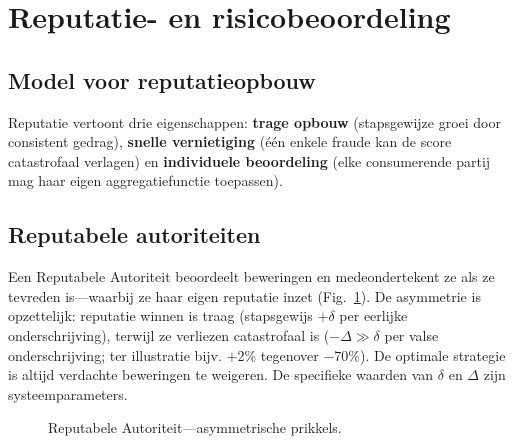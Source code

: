 \documentclass[11pt,a4paper,twocolumn]{article}
\begin{document}
\section{Reputatie- en risicobeoordeling}

\subsection{Model voor reputatieopbouw}

Reputatie vertoont drie eigenschappen: \textbf{trage opbouw} (stapsgewijze groei door consistent gedrag), \textbf{snelle vernietiging} (één enkele fraude kan de score catastrofaal verlagen) en \textbf{individuele beoordeling} (elke consumerende partij mag haar eigen aggregatiefunctie toepassen).

\subsection{Reputabele autoriteiten}

Een Reputabele Autoriteit beoordeelt beweringen en medeondertekent ze als ze tevreden is---waarbij ze haar eigen reputatie inzet (Fig.~\ref{fig:authority}). De asymmetrie is opzettelijk: reputatie winnen is traag (stapsgewijs $+\delta$ per eerlijke onderschrijving), terwijl ze verliezen catastrofaal is ($-\Delta \gg \delta$ per valse onderschrijving; ter illustratie bijv. $+2\%$ tegenover $-70\%$). De optimale strategie is altijd verdachte beweringen te weigeren. De specifieke waarden van $\delta$ en $\Delta$ zijn systeemparameters.

\begin{figure}[ht]
\centering
{}
\caption{Reputabele Autoriteit---asymmetrische prikkels.}
\label{fig:authority}
\end{figure}
\end{document}
